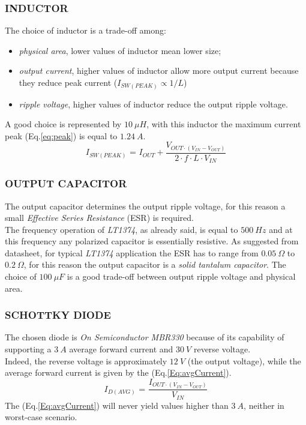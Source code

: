 \subsubsection{INDUCTOR}
The choice of inductor is a trade-off among:
\begin{itemize}
	\item \textit{physical area}, lower values of inductor mean lower size;
	\item \textit{output current}, higher values of inductor allow more output current because they reduce peak current ($I_{SW\left(PEAK\right)} \propto 1/L$)
	\item \textit{ripple voltage}, higher values of inductor reduce the output ripple voltage.
\end{itemize}
A good choice is represented by $10\ \mu H$, with this inductor the maximum current peak (Eq.\ref{eq:peak}) is equal to $1.24\ A$.
\begin{equation}
I_{SW\left(PEAK\right)} \text{ = } I_{OUT} + \frac{V_{OUT \cdot \left(V_{IN} - V_{OUT}\right)}}{2 \cdot f \cdot L \cdot V_{IN}}
\label{eq:peak}
\end{equation}
\subsubsection{OUTPUT CAPACITOR}
The output capacitor determines the output ripple voltage, for this reason a small \textit{Effective Series Resistance} (ESR) is required.\\
The frequency operation of \textit{LT1374}, as already said, is equal to $500\ Hz$ and at this frequency any polarized capacitor is essentially resistive. As suggested from datasheet, for typical \textit{LT1374} application the ESR has to range from $0.05\ \varOmega$ to $0.2\ \varOmega$, for this reason the output capacitor is a \textit{solid tantalum capacitor}. The choice of $100\ \mu F$ is a good trade-off between output ripple voltage and physical area.
\subsubsection{SCHOTTKY DIODE}
The chosen diode is \textit{On Semiconductor MBR330} because of its capability of supporting a $3\ A$ average forward current and $30\ V$ reverse voltage.\\
Indeed, the reverse voltage is approximately $12\ V$ (the output voltage), while
the average forward current is given by the (Eq.\ref{Eq:avgCurrent}).
\begin{equation}
	I_{D \left(AVG\right)} \text{ = } \frac{I_{OUT \cdot \left(V_{IN} - V_{OUT}\right)}}{V_{IN}}
	\label{Eq:avgCurrent}
\end{equation}
The (Eq.\ref{Eq:avgCurrent}) will never yield values higher than $3\ A$, neither in worst-case scenario.
